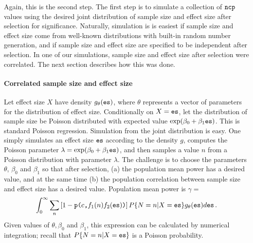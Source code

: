 \documentclass[jou]{apa6} %
\newcommand{\R}[1]{\mbox{\texttt{#1}}} %
\begin{document}
Again, this is the second step. The first step is to simulate a collection of $\R{ncp}$ values using the desired joint distribution of sample size and effect size after selection for significance. Naturally, simulation is is easiest if sample size and effect size come from well-known distributions with built-in random number generation, and if sample size and effect size are specified to be independent after selection. In one of our simulations, sample size and effect size after selection were correlated. The next section describes how this was done.

\paragraph{Correlated sample size and effect size}
Let effect size $X$ have density $g_\theta(\R{es})$, where $\theta$ represents a vector of parameters for the distribution of effect size. Conditionally on $X=\R{es}$, let the distribution of sample size be Poisson distributed with expected value $\exp(\beta_0+\beta_1\R{es})$. This is standard Poisson regression. Simulation from the joint distribution is easy. One simply simulates an effect size $\R{es}$ according to the density $g$, computes the Poisson parameter $\lambda = \exp(\beta_0+\beta_1\R{es})$, and then samples a value $n$ from a Poisson distribution with parameter $\lambda$. The challenge is to choose the parameters $\theta$, $\beta_0$ and $\beta_1$ so that after selection, (a) the population mean power has a desired value, and at the same time (b) the population correlation between sample size and effect size has a desired value. Population mean power is $\gamma = $
\begin{equation*}
    \int_0^\infty \sum_n \left[ 1-\R{p(}c\R{,}f_1(n)f_2(\R{es})\R{)} \right]
             P\{N=n|X=\R{es}\} g_\theta(\R{es}) d\R{es} \, .
\end{equation*}
Given values of $\theta, \beta_0$ and $\beta_1$, this expression can be calculated by numerical integration; recall that $P\{N=n|X=\R{es}\}$ is a Poisson probability.
\end{document}
